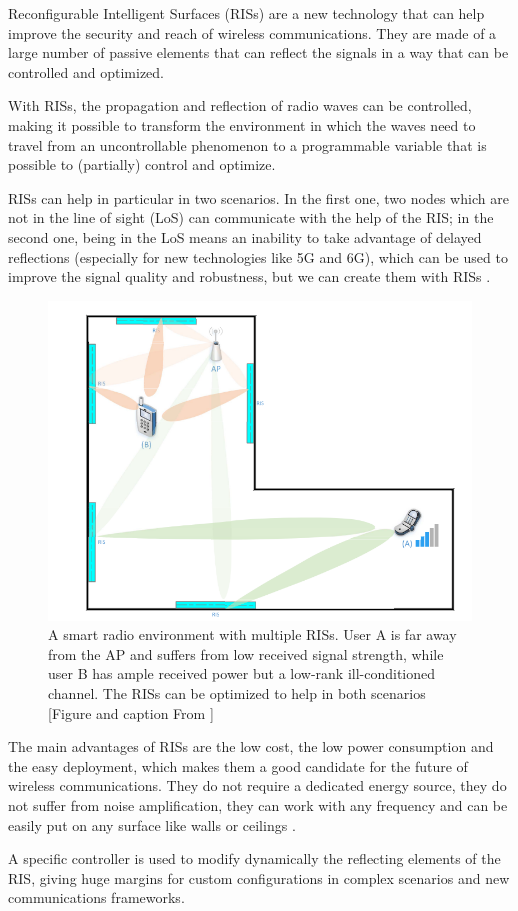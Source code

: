 Reconfigurable Intelligent Surfaces (RISs) are a new technology that can help improve the security and reach of wireless communications. They are made of a large number of passive elements that can reflect the signals in a way that can be controlled and optimized.

With RISs, the propagation and reflection of radio waves can be controlled, making it possible to transform the environment in which the waves need to travel from an uncontrollable phenomenon to a programmable variable that is possible to (partially) control and optimize.

RISs can help in particular in two scenarios. In the first one, two nodes which are not in the line of sight (LoS) can communicate with the help of the RIS; in the second one, being in the LoS means an inability to take advantage of delayed reflections (especially for new technologies like 5G and 6G), which can be used to improve the signal quality and robustness, but we can create them with RISs \cite{9086766}.

\begin{figure}[H]
  \centering
  \includegraphics[width=0.5\linewidth]{imgs/RIS enviroment.png}
  \caption{A smart radio environment with multiple RISs. User A is far away from the AP and suffers from low received signal strength, while user B has ample received power but a low-rank ill-conditioned channel. The RISs can be optimized to help in both scenarios [Figure and caption From \cite{9086766}]}
\end{figure}

The main advantages of RISs are the low cost, the low power consumption and the easy deployment, which makes them a good candidate for the future of wireless communications. They do not require a dedicated energy source, they do not suffer from noise amplification, they can work with any frequency and can be easily put on any surface like walls or ceilings \cite{8796365}.

A specific controller is used to modify dynamically the reflecting elements of the RIS, giving huge margins for custom configurations in complex scenarios and new communications frameworks.

